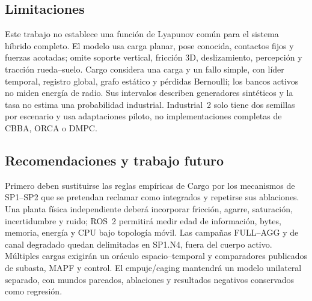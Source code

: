 \subsection{Limitaciones}

Este trabajo no establece una función de Lyapunov común para el sistema híbrido completo. El modelo usa carga planar, pose conocida, contactos fijos y fuerzas acotadas; omite soporte vertical, fricción 3D, deslizamiento, percepción y tracción rueda--suelo. Cargo considera una carga y un fallo simple, con líder temporal, registro global, grafo estático y pérdidas Bernoulli; los bancos activos no miden energía de radio. Sus intervalos describen generadores sintéticos y la tasa \CargoEtwoESuccess{} no estima una probabilidad industrial. Industrial~2 solo tiene dos semillas por escenario y usa adaptaciones piloto, no implementaciones completas de CBBA, ORCA o DMPC.

\subsection{Recomendaciones y trabajo futuro}

Primero deben sustituirse las reglas empíricas de Cargo por los mecanismos de SP1--SP2 que se pretendan reclamar como integrados y repetirse sus ablaciones. Una planta física independiente deberá incorporar fricción, agarre, saturación, incertidumbre y ruido; ROS~2 permitirá medir edad de información, bytes, memoria, energía y CPU bajo topología móvil. Las campañas FULL--AGG y de canal degradado quedan delimitadas en SP1.N4, fuera del cuerpo activo. Múltiples cargas exigirán un oráculo espacio--temporal y comparadores publicados de subasta, MAPF y control. El empuje/caging mantendrá un modelo unilateral separado, con mundos pareados, ablaciones y resultados negativos conservados como regresión.
